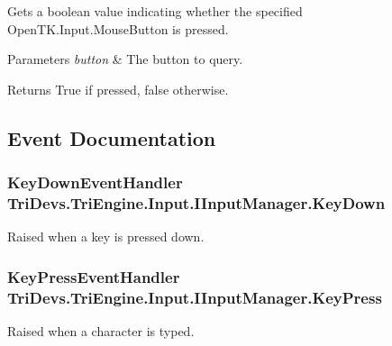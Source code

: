 Gets a boolean value indicating whether the specified Open\-T\-K.\-Input.\-Mouse\-Button is pressed. 


\begin{DoxyParams}{Parameters}
{\em button} & The button to query.\\
\hline
\end{DoxyParams}
\begin{DoxyReturn}{Returns}
True if pressed, false otherwise.
\end{DoxyReturn}


\subsection{Event Documentation}
\hypertarget{interface_tri_devs_1_1_tri_engine_1_1_input_1_1_i_input_manager_a99f5fc3c551b90a6195354eb10107fae}{
\subsubsection[{Key\-Down}]{\setlength{\rightskip}{0pt plus 5cm}Key\-Down\-Event\-Handler Tri\-Devs.\-Tri\-Engine.\-Input.\-I\-Input\-Manager.\-Key\-Down}}\label{interface_tri_devs_1_1_tri_engine_1_1_input_1_1_i_input_manager_a99f5fc3c551b90a6195354eb10107fae}


Raised when a key is pressed down. 

\hypertarget{interface_tri_devs_1_1_tri_engine_1_1_input_1_1_i_input_manager_a33baf0fdb394f0a409e8e8ac4b422240}{
\subsubsection[{Key\-Press}]{\setlength{\rightskip}{0pt plus 5cm}Key\-Press\-Event\-Handler Tri\-Devs.\-Tri\-Engine.\-Input.\-I\-Input\-Manager.\-Key\-Press}}\label{interface_tri_devs_1_1_tri_engine_1_1_input_1_1_i_input_manager_a33baf0fdb394f0a409e8e8ac4b422240}


Raised when a character is typed. 


